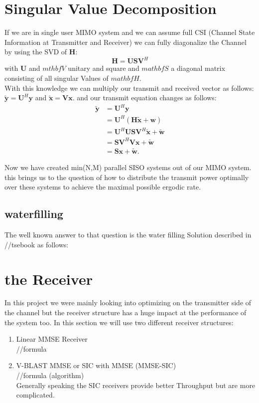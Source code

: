\section{Singular Value Decomposition}
If we are in single user MIMO system and we can assume full CSI (Channel State Information at Transmitter and Receiver) we can fully diagonalize the Channel by using the SVD of $\mathbf{H}$:
\begin{equation}
	\mathbf{H} = \mathbf{USV}^H
\end{equation}
with $\mathbf{U}$ and $mthbf{V}$ unitary and square and $mathbf{S}$ a diagonal matrix consisting of all singular Values of $mathbf{H}$.\\
With this knowledge we can multiply our transmit and received vector as follows: $\mathbf{\tilde{y}} = \mathbf{U}^H\mathbf{y} $ and $ \mathbf{\tilde{x}} = \mathbf{Vx}$. and our transmit equation changes as follows: 
\begin{align}
	\mathbf{\tilde{y}} &= \mathbf{U}^H\mathbf{y} \\
	& = \mathbf{U}^H(\mathbf{H\tilde{x} + w}) \\
	& = \mathbf{U}^H\mathbf{USV}^H\mathbf{\tilde{x}+\tilde{w}}\\
	& = \mathbf{SV}^H\mathbf{Vx}+\mathbf{\tilde{w}}\\
	&= \mathbf{Sx + \tilde{w}}.
\end{align}

Now we have created min(N,M) parallel SISO systems out of our MIMO system. this brings us to the question of how to distribute the transmit power optimally over these systems to achieve the maximal possible ergodic rate.
\subsection{waterfilling}
The well known answer to that question is the water filling Solution described in //tsebook as follows:


\section{the Receiver}
In this project we were mainly looking into optimizing on the transmitter side of the channel but the receiver structure has a huge impact at the performance of the system too.
In this section we will use two different receiver structures:
\begin{enumerate}
	\item Linear MMSE Receiver\\
	//formula
	\item V-BLAST MMSE or SIC with MMSE (MMSE-SIC)\\
	//formula (algorithm)\\
	Generally speaking the SIC receivers provide better Throughput but are more complicated.
\end{enumerate}

